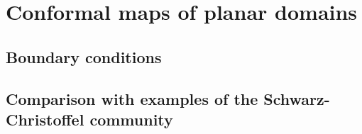\section{Conformal maps of planar domains}
\label{sec:planar_domains}
\subsection{Boundary conditions}
\subsection{Comparison with examples of the Schwarz-Christoffel community}


